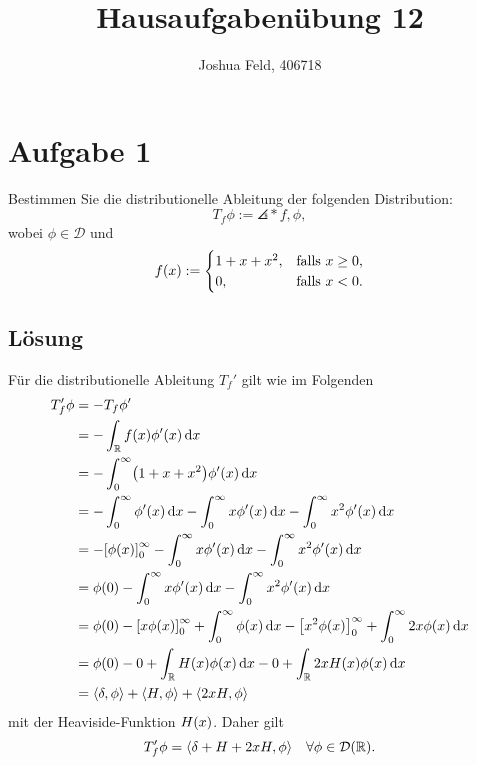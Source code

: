 \documentclass{exercise}
\institute{Applied and Computational Mathematics}
\title{Hausaufgabenübung 12}
\author{Joshua Feld, 406718}
\begin{document}
    \maketitle


    \section*{Aufgabe 1}
    
    \begin{problem}
        Bestimmen Sie die distributionelle Ableitung der folgenden Distribution:
        \[
            T_f \phi := \angles*{f, \phi},
        \]
        wobei \(\phi \in \mathcal{D}\) und
        \[
            f\parentheses*{x} := \begin{cases}
                1 + x + x^2, & \text{falls }x \ge 0,\\
                0, & \text{falls }x < 0.
            \end{cases}
        \]
    \end{problem}
    
    \subsection*{Lösung}
    Für die distributionelle Ableitung \(T_f'\) gilt wie im Folgenden
    \begin{align*}
        T_f'\phi &= -T_f \phi'\\
        &= -\int_\R f\parentheses*{x}\phi'\parentheses*{x}\d x\\
        &= -\int_0^\infty \parentheses*{1 + x + x^2}\phi'\parentheses*{x}\d x\\
        &= -\int_0^\infty \phi'\parentheses*{x}\d x - \int_0^\infty x\phi'\parentheses*{x}\d x - \int_0^\infty x^2 \phi'\parentheses*{x}\d x\\
        &= -\brackets*{\phi\parentheses*{x}}_0^\infty - \int_0^\infty x\phi'\parentheses*{x}\d x - \int_0^\infty x^2 \phi'\parentheses*{x}\d x\\
        &= \phi\parentheses*{0} - \int_0^\infty x\phi'\parentheses*{x}\d x - \int_0^\infty x^2 \phi'\parentheses*{x}\d x\\
        &= \phi\parentheses*{0} - \brackets*{x\phi\parentheses*{x}}_0^\infty + \int_0^\infty \phi\parentheses*{x}\d x - \brackets*{x^2 \phi\parentheses*{x}}_0^\infty + \int_0^\infty 2x\phi\parentheses*{x}\d x\\
        &= \phi\parentheses*{0} - 0 + \int_\R H\parentheses*{x}\phi\parentheses*{x}\d x - 0 + \int_\R 2xH\parentheses*{x}\phi\parentheses*{x}\d x\\
        &= \angles*{\delta, \phi} + \angles*{H, \phi} + \angles*{2xH, \phi}
    \end{align*}
    mit der Heaviside-Funktion \(H\parentheses*{x}\).
    Daher gilt
    \[
        T_f'\phi = \angles*{\delta + H + 2xH, \phi} \quad \forall\phi \in \mathcal{D}\parentheses*{\R}.
    \]
\end{document}
